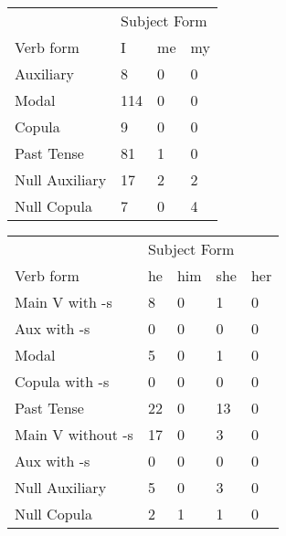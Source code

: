 \begin{table}[]
\begin{minipage}{0.5\textwidth}
    \centering
    \begin{tabular}{@{}llll@{}}
        \toprule
            &\multicolumn{3}{l}{Subject Form}\\
            \cline{2-4}
        Verb form & I & me & my \\
        \midrule
        Auxiliary & 8 & 0 & 0 \\
        Modal & 114 & 0 & 0 \\
        Copula & 9 & 0 & 0 \\
        Past Tense & 81 & 1 & 0 \\
        \hline
        Null Auxiliary & 17 & 2 & 2 \\
        Null Copula & 7 & 0 & 4 \\
        \bottomrule
    \end{tabular}
\end{minipage}
\begin{minipage}{0.5\textwidth}
    \centering
    \begin{tabular}{@{}lllll@{}}
        \toprule
            &\multicolumn{4}{l}{Subject Form}\\
            \cline{2-5}
        Verb form & he & him & she & her \\
        \midrule
        Main V with -s & 8 & 0 & 1 & 0 \\
        Aux with -s & 0 & 0 & 0 & 0 \\
        Modal & 5 & 0 & 1 & 0 \\
        Copula with -s & 0 & 0 & 0 & 0 \\
        Past Tense & 22 & 0 & 13 & 0 \\
        \hline
        Main V without -s & 17 & 0 & 3 & 0 \\
        Aux with -s & 0 & 0 & 0 & 0 \\
        Null Auxiliary & 5 & 0 & 3 & 0 \\
        Null Copula & 2 & 1 & 1 & 0 \\
        \bottomrule
    \end{tabular}
    \end{minipage}
\end{table}

